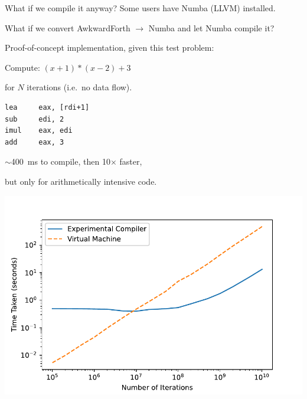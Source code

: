 \documentclass[aspectratio=169]{beamer}
\begin{document}
\begin{frame}[fragile]{What if we compile it anyway?}
\vspace{0.5 cm}
Some users have Numba (LLVM) installed.

\vspace{0.25 cm}
What if we convert AwkwardForth $\to$ Numba and let Numba compile it?

\vspace{0.5 cm}
Proof-of-concept implementation, given this test problem:

\vspace{0.25 cm}
Compute: $(x + 1) * (x - 2) + 3$

for $N$ iterations (i.e.\ no data flow).

\vspace{0.25 cm}

\vspace{0.25 cm}
\scriptsize
\begin{verbatim}
lea     eax, [rdi+1]
sub     edi, 2
imul    eax, edi
add     eax, 3
\end{verbatim}

\normalsize
\vspace{0.5 cm}
$\sim$400~ms to compile, then 10$\times$ faster,

but only for arithmetically intensive code.

\vspace{-5.5 cm}
\hfill \includegraphics[width=0.6\linewidth]{PLOTS/new_compiler.pdf} \mbox{\hspace{-1 cm}}

\end{frame}
\end{document}
